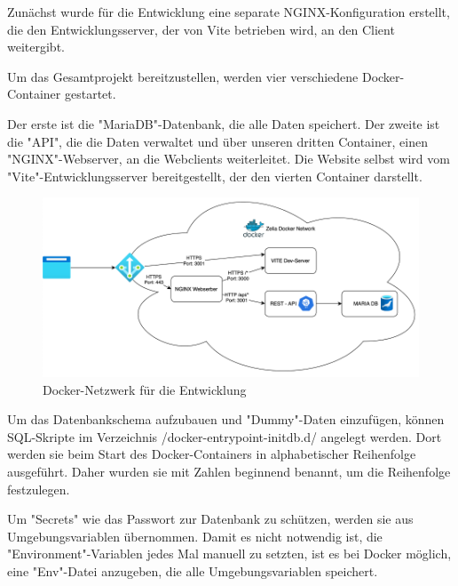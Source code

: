 
Zunächst wurde für die Entwicklung eine separate NGINX-Konfiguration erstellt, die den Entwicklungsserver, der von Vite betrieben wird, an den Client weitergibt.


Um das Gesamtprojekt bereitzustellen, werden vier verschiedene Docker-Container gestartet.

Der erste ist die "MariaDB"-Datenbank, die alle Daten speichert. Der zweite ist die "API", die die Daten verwaltet und über unseren dritten Container, einen "NGINX"-Webserver, an die Webclients weiterleitet. Die Website selbst wird vom "Vite"-Entwicklungsserver bereitgestellt, der den vierten Container darstellt. 

\begin{figure}[H]
    \centering
    \includegraphics{media/Docker/DevNetwork.png}
    \caption{Docker-Netzwerk für die Entwicklung}
\end{figure}

Um das Datenbankschema aufzubauen und "Dummy"-Daten einzufügen, können SQL-Skripte im Verzeichnis /docker-entrypoint-initdb.d/ angelegt werden. Dort werden sie beim Start des Docker-Containers in alphabetischer Reihenfolge ausgeführt. Daher wurden sie mit Zahlen beginnend benannt, um die Reihenfolge festzulegen.

Um "Secrets" wie das Passwort zur Datenbank zu schützen, werden sie aus Umgebungsvariablen übernommen. Damit es nicht notwendig ist, die "Environment"-Variablen jedes Mal manuell zu setzten, ist es bei Docker möglich, eine "Env"-Datei anzugeben, die alle Umgebungsvariablen speichert. 

